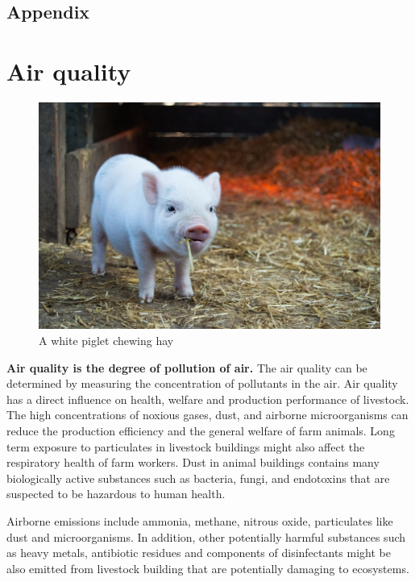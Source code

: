 \documentclass[]{book}
\begin{document}
\hypertarget{appendix-1}{%
\section{Appendix}\label{appendix-1}}

\hypertarget{air-quality}{%
\chapter{Air quality}\label{air-quality}}

\begin{figure}

{\centering \includegraphics[width=1\linewidth,height=1\textheight]{figures/pig-straw} 

}

\caption{A white piglet chewing hay}\label{fig:pig-straw}
\end{figure}

\textbf{Air quality is the degree of pollution of air.} The air quality can be determined by measuring the concentration of pollutants in the air. Air quality has a direct influence on health, welfare and production performance of livestock. The high concentrations of noxious gases, dust, and airborne microorganisms can reduce the production efficiency and the general welfare of farm animals. Long term exposure to particulates in livestock buildings might also affect the respiratory health of farm workers. Dust in animal buildings contains many biologically active substances such as bacteria, fungi, and endotoxins that are suspected to be hazardous to human health.

Airborne emissions include ammonia, methane, nitrous oxide, particulates like dust and microorganisms. In addition, other potentially harmful substances such as heavy metals, antibiotic residues and components of disinfectants might be also emitted from livestock building that are potentially damaging to ecosystems.
\end{document}
